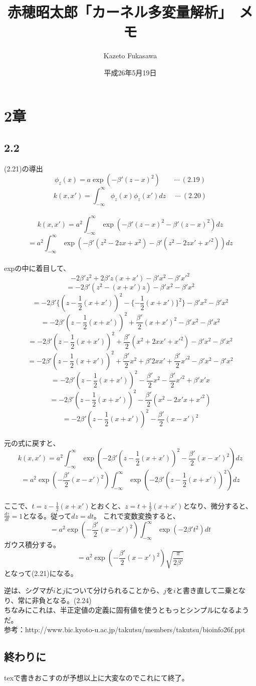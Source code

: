\documentclass{jarticle}
\title{赤穂昭太郎「カーネル多変量解析」　メモ}
\author{Kazeto Fukasawa}
\date{平成26年5月19日}
\begin{document}
\maketitle
\section{2章}
\subsection*{2.2}
(2.21)の導出\\
\[
\phi_{z}(x) = a \exp(-\beta'(z-x)^2) \ \ \ \ \ \ \ \ \ \cdots \ (2.19)
\]
\[
k(x,x') = \int_{-\infty}^{\infty} \phi_{z}(x) \phi_{z}(x') dz \ \ \ \ \ \  \cdots \ (2.20)
\]
\\
\[
k(x,x') = a^2 \int_{-\infty}^{\infty} \exp(-\beta' (z-x)^2 - \beta' (z-x)^2) dz
\]
\[
= a^2 \int_{-\infty}^{\infty} \exp(-\beta' (z^2-2zx+x^2) - \beta' (z^2-2zx'+x'^2) ) dz
\]
\\
expの中に着目して、\\
\[
-2\beta'z^2 + 2\beta'z(x+x') -\beta'x^2 - \beta'x'^2
\]
\[
= -2\beta'(z^2 - (x+x')z) - \beta'x^2 - \beta'x^2
\]
\[
= -2\beta' \{(z - \frac{1}{2} (x+x'))^2 - \{- \frac{1}{2}(x+x') \}^2 \}  - \beta'x^2 - \beta'x^2
\]
\[
= -2\beta' (z-\frac{1}{2} (x+x'))^2 + \frac{\beta'}{2}(x+x')^2   - \beta'x^2 - \beta'x^2
\]
 \[
 = -2\beta' (z-\frac{1}{2} (x+x'))^2 + \frac{\beta'}{2}(x^2 + 2xx' + x'^2) - \beta'x^2 - \beta'x^2
 \]
 \[
  = -2\beta' (z-\frac{1}{2} (x+x'))^2 + \frac{\beta'}{2}x^2 +\beta' 2xx' +\frac{\beta'}{2}x'^2 - \beta'x^2 - \beta'x^2
 \]
 \[
   = -2\beta' (z-\frac{1}{2} (x+x'))^2  - \frac{\beta'}{2}x^2 - \frac{\beta'}{2}x'^2 + \beta' x' x
 \]
 \[
    = -2\beta' (z-\frac{1}{2} (x+x'))^2 - \frac{\beta'}{2}(x^2 - 2x'x + x'^2)
 \]
 \[
  = -2\beta' (z-\frac{1}{2} (x+x'))^2 - \frac{\beta'}{2}(x-x')^2
  \]
\\  
元の式に戻すと、
\[
k(x,x') = a^2 \int_{-\infty}^{\infty} \exp(-2\beta' (z-\frac{1}{2} (x+x'))^2 - \frac{\beta'}{2}(x-x')^2) dz
\]
\[
= a^2 \exp(- \frac{\beta'}{2}(x-x')^2)  \int_{-\infty}^{\infty} \exp(-2\beta' (z-\frac{1}{2} (x+x'))^2 ) dz
\]
\\
ここで、$t=z-\frac{1}{2}(x+x')$とおくと、$z=t+\frac{1}{2}(x+x')$となり、微分すると、$\frac{dz}{dt} =1$となる。従って$dz=dt$。
これで変数変換すると、
\[
 =  a^2 \exp(- \frac{\beta'}{2}(x-x')^2)  \int_{-\infty}^{\infty} \exp(-2\beta' t^2) dt
\]
ガウス積分する。
\[
= a^2 \exp(- \frac{\beta'}{2}(x-x')^2) \sqrt{\frac{\pi}{2\beta'}}
\]
となって(2.21)になる。

逆は、シグマが$i$と$j$について分けられることから、$j$を$i$と書き直して二乗となり、常に非負となる。(2.24)\\
ちなみにこれは、半正定値の定義に固有値を使うともっとシンプルになるようだ。\\
参考：http://www.bic.kyoto-u.ac.jp/takutsu/members/takutsu/bioinfo26f.ppt\\


\subsection*{終わりに}
texで書きおこすのが予想以上に大変なのでこれにて終了。
\end{document}
